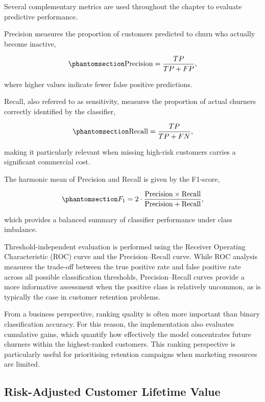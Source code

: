 \documentclass[
  12pt,
  letterpaper,
]{book}
\begin{document}
Several complementary metrics are used throughout the chapter to
evaluate predictive performance.

Precision measures the proportion of customers predicted to churn who
actually become inactive,

\begin{equation}\phantomsection\label{eq-precision}{
\mathrm{Precision}
=
\frac{TP}{TP+FP},
}\end{equation}

where higher values indicate fewer false positive predictions.

Recall, also referred to as sensitivity, measures the proportion of
actual churners correctly identified by the classifier,

\begin{equation}\phantomsection\label{eq-recall}{
\mathrm{Recall}
=
\frac{TP}{TP+FN},
}\end{equation}

making it particularly relevant when missing high-risk customers carries
a significant commercial cost.

The harmonic mean of Precision and Recall is given by the F1-score,

\begin{equation}\phantomsection\label{eq-f1}{
F_1
=
2
\cdot
\frac{\mathrm{Precision}\times\mathrm{Recall}}
{\mathrm{Precision}+\mathrm{Recall}},
}\end{equation}

which provides a balanced summary of classifier performance under class
imbalance.

Threshold-independent evaluation is performed using the Receiver
Operating Characteristic (ROC) curve and the Precision--Recall curve.
While ROC analysis measures the trade-off between the true positive rate
and false positive rate across all possible classification thresholds,
Precision--Recall curves provide a more informative assessment when the
positive class is relatively uncommon, as is typically the case in
customer retention problems.

From a business perspective, ranking quality is often more important
than binary classification accuracy. For this reason, the implementation
also evaluates cumulative gains, which quantify how effectively the
model concentrates future churners within the highest-ranked customers.
This ranking perspective is particularly useful for prioritising
retention campaigns when marketing resources are limited.

\subsection{Risk-Adjusted Customer Lifetime
Value}\label{risk-adjusted-customer-lifetime-value}
\end{document}
